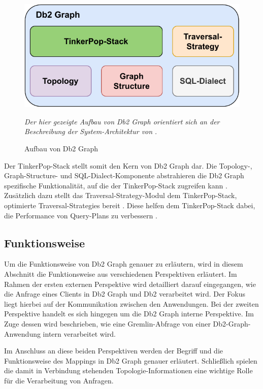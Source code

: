 \begin{figure}[!ht]
    \centering
    \includegraphics[width=\textwidth]{images/db2graph_components.pdf}
    \caption{Aufbau von Db2 Graph}
    \label{fig:db2graph_aufbau}
    \vspace{0.5em}
    \textit{Der hier gezeigte Aufbau von Db2 Graph orientiert sich an der Beschreibung der System-Architektur von} \textit{.}
\end{figure}

Der TinkerPop-Stack stellt somit den Kern von Db2 Graph dar. Die Topology-, Graph-Structure- und SQL-Dialect-Komponente abstrahieren die Db2 Graph spezifische Funktionalität, auf die der TinkerPop-Stack zugreifen kann \cite{sigmod_tian}. Zusätzlich dazu stellt das Traversal-Strategy-Modul dem TinkerPop-Stack, optimierte Traversal-Strategies bereit \cite{sigmod_tian}. Diese helfen dem TinkerPop-Stack dabei, die Performance von Query-Plans zu verbessern \cite{sigmod_tian}.

\subsection{Funktionsweise}
\label{db2graph:funktionsweise}
Um die Funktionsweise von Db2 Graph genauer zu erläutern, wird in diesem Abschnitt die Funktionsweise aus verschiedenen Perspektiven erläutert. Im Rahmen der ersten externen Perspektive wird detailliert darauf eingegangen, wie die Anfrage eines Clients in Db2 Graph und Db2 verarbeitet wird. Der Fokus liegt hierbei auf der Kommunikation zwischen den Anwendungen. Bei der zweiten Perspektive handelt es sich hingegen um die Db2 Graph interne Perspektive. Im Zuge dessen wird beschrieben, wie eine Gremlin-Abfrage von einer Db2-Graph-Anwendung intern verarbeitet wird. 

Im Anschluss an diese beiden Perspektiven werden der Begriff und die Funktionsweise des Mappings in Db2 Graph genauer erläutert. Schließlich spielen die damit in Verbindung stehenden Topologie-Informationen eine wichtige Rolle für die Verarbeitung von Anfragen.

